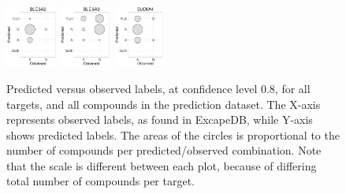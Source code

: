 \documentclass[10pt,article]{memoir}
\begin{document}
\begin{figure}
\includegraphics[width=0.15\textwidth]{figures/validation_plots/slc6a2_0p8_valplot.pdf}
\includegraphics[width=0.15\textwidth]{figures/validation_plots/slc6a3_0p8_valplot.pdf}
\vspace*{10pt} %
\includegraphics[width=0.15\textwidth]{figures/validation_plots/slc6a4_0p8_valplot.pdf}

    \caption{Predicted versus observed labels, at confidence level 0.8, for all
    targets, and all compounds in the prediction dataset.  The X-axis
    represents observed labels, as found in ExcapeDB, while Y-axis shows
    predicted labels. The areas of the circles is proportional to the number of
    compounds per predicted/observed combination. Note that the scale is
    different between each plot, because of differing total number of compounds
    per target.
    \label{fig:valplots_all_0.8}}
\end{figure}
%
\end{document}
